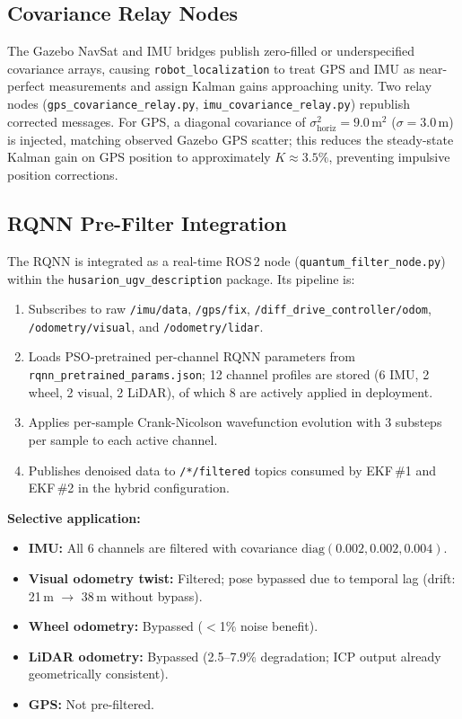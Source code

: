 \documentclass[conference]{IEEEtran}
\begin{document}
\subsection{Covariance Relay Nodes}

The Gazebo NavSat and IMU bridges publish zero-filled or underspecified covariance
arrays, causing \texttt{robot\_localization} to treat GPS and IMU as near-perfect
measurements and assign Kalman gains approaching unity. Two relay nodes
(\texttt{gps\_covariance\_relay.py}, \texttt{imu\_covariance\_relay.py}) republish
corrected messages. For GPS, a diagonal covariance of
$\sigma^2_{\text{horiz}} = 9.0$\,m$^2$ ($\sigma = 3.0$\,m) is injected, matching
observed Gazebo GPS scatter; this reduces the steady-state Kalman gain on GPS
position to approximately $K \approx 3.5\%$, preventing impulsive position
corrections.

\subsection{RQNN Pre-Filter Integration}

The RQNN is integrated as a real-time ROS\,2 node
(\texttt{quantum\_filter\_node.py}) within the \texttt{husarion\_ugv\_description}
package. Its pipeline is:
\begin{enumerate}[itemsep=2pt,parsep=0pt]
\item Subscribes to raw \texttt{/imu/data}, \texttt{/gps/fix},
      \texttt{/diff\_drive\_controller/odom}, \texttt{/odometry/visual}, and
      \texttt{/odometry/lidar}.
\item Loads PSO-pretrained per-channel RQNN parameters from
      \texttt{rqnn\_pretrained\_params.json}; 12 channel profiles are stored (6 IMU,
      2 wheel, 2 visual, 2 LiDAR), of which 8 are actively applied in deployment.
\item Applies per-sample Crank-Nicolson wavefunction evolution with 3 substeps per
      sample to each active channel.
\item Publishes denoised data to \texttt{/*/filtered} topics consumed by EKF\,\#1
      and EKF\,\#2 in the hybrid configuration.
\end{enumerate}

\textbf{Selective application:}
\begin{itemize}[leftmargin=1.5em, itemsep=2pt]
\item \textbf{IMU:} All 6 channels are filtered with covariance
      $\mathrm{diag}(0.002, 0.002, 0.004)$.
\item \textbf{Visual odometry twist:} Filtered; pose bypassed due to temporal lag
      (drift: 21\,m $\rightarrow$ 38\,m without bypass).
\item \textbf{Wheel odometry:} Bypassed ($<$1\% noise benefit).
\item \textbf{LiDAR odometry:} Bypassed (2.5--7.9\% degradation; ICP output already
      geometrically consistent).
\item \textbf{GPS:} Not pre-filtered.
\end{itemize}
\end{document}
